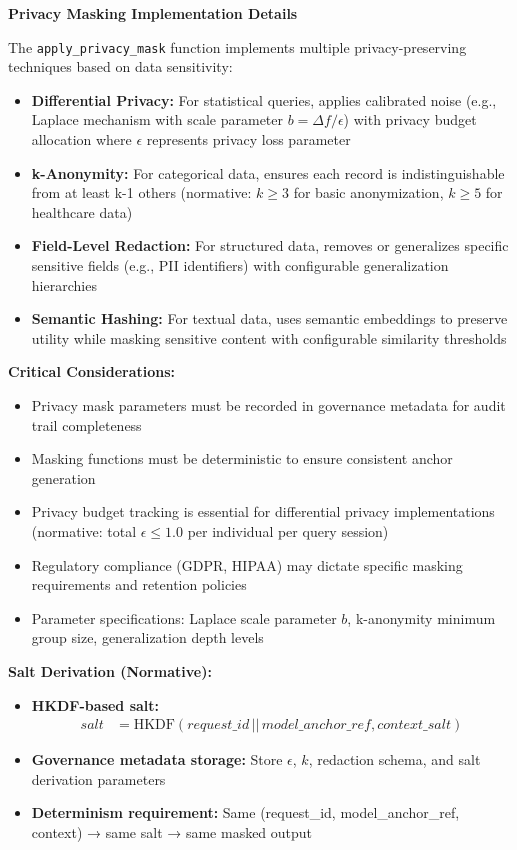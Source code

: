 \documentclass[12pt,a4paper]{article}
\begin{document}
\begin{technicalbox}
\textbf{Privacy Masking Implementation Details}

The \texttt{apply\_privacy\_mask} function implements multiple privacy-preserving techniques based on data sensitivity:

\begin{itemize}
\item \textbf{Differential Privacy:} For statistical queries, applies calibrated noise (e.g., Laplace mechanism with scale parameter $b = \Delta f / \epsilon$) with privacy budget allocation where $\epsilon$ represents privacy loss parameter
\item \textbf{k-Anonymity:} For categorical data, ensures each record is indistinguishable from at least k-1 others (normative: $k \geq 3$ for basic anonymization, $k \geq 5$ for healthcare data)
\item \textbf{Field-Level Redaction:} For structured data, removes or generalizes specific sensitive fields (e.g., PII identifiers) with configurable generalization hierarchies
\item \textbf{Semantic Hashing:} For textual data, uses semantic embeddings to preserve utility while masking sensitive content with configurable similarity thresholds
\end{itemize}

\textbf{Critical Considerations:}
\begin{itemize}
\item Privacy mask parameters must be recorded in governance metadata for audit trail completeness
\item Masking functions must be deterministic to ensure consistent anchor generation
\item Privacy budget tracking is essential for differential privacy implementations (normative: total $\epsilon \leq 1.0$ per individual per query session)
\item Regulatory compliance (GDPR, HIPAA) may dictate specific masking requirements and retention policies
\item Parameter specifications: Laplace scale parameter $b$, k-anonymity minimum group size, generalization depth levels
\end{itemize}

\textbf{Salt Derivation (Normative):}
\begin{itemize}
\item \textbf{HKDF-based salt:} 
\begin{align*}
salt &= \text{HKDF}(request\_id \,||\, model\_anchor\_ref, context\_salt)
\end{align*}
\item \textbf{Governance metadata storage:} Store $\epsilon$, $k$, redaction schema, and salt derivation parameters
\item \textbf{Determinism requirement:} Same (request\_id, model\_anchor\_ref, context) → same salt → same masked output
\end{itemize}
\end{technicalbox}
\end{document}
